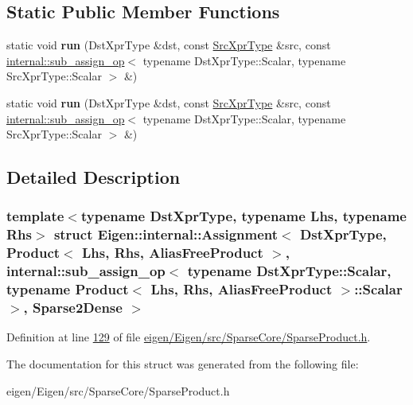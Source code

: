 \subsection*{Static Public Member Functions}
\begin{DoxyCompactItemize}
\item 
\mbox{\label{struct_eigen_1_1internal_1_1_assignment_3_01_dst_xpr_type_00_01_product_3_01_lhs_00_01_rhs_00_014697dd90e96dca324eed00088adc1a1c_ad3dfa9d4dc1b79e20c0ef37b2d3f66fd}} 
static void {\bfseries run} (Dst\+Xpr\+Type \&dst, const \hyperlink{group___core___module_class_eigen_1_1_product}{Src\+Xpr\+Type} \&src, const \hyperlink{struct_eigen_1_1internal_1_1sub__assign__op}{internal\+::sub\+\_\+assign\+\_\+op}$<$ typename Dst\+Xpr\+Type\+::\+Scalar, typename Src\+Xpr\+Type\+::\+Scalar $>$ \&)
\item 
\mbox{\label{struct_eigen_1_1internal_1_1_assignment_3_01_dst_xpr_type_00_01_product_3_01_lhs_00_01_rhs_00_014697dd90e96dca324eed00088adc1a1c_ad3dfa9d4dc1b79e20c0ef37b2d3f66fd}} 
static void {\bfseries run} (Dst\+Xpr\+Type \&dst, const \hyperlink{group___core___module_class_eigen_1_1_product}{Src\+Xpr\+Type} \&src, const \hyperlink{struct_eigen_1_1internal_1_1sub__assign__op}{internal\+::sub\+\_\+assign\+\_\+op}$<$ typename Dst\+Xpr\+Type\+::\+Scalar, typename Src\+Xpr\+Type\+::\+Scalar $>$ \&)
\end{DoxyCompactItemize}


\subsection{Detailed Description}
\subsubsection*{template$<$typename Dst\+Xpr\+Type, typename Lhs, typename Rhs$>$\newline
struct Eigen\+::internal\+::\+Assignment$<$ Dst\+Xpr\+Type, Product$<$ Lhs, Rhs, Alias\+Free\+Product $>$, internal\+::sub\+\_\+assign\+\_\+op$<$ typename Dst\+Xpr\+Type\+::\+Scalar, typename Product$<$ Lhs, Rhs, Alias\+Free\+Product $>$\+::\+Scalar $>$, Sparse2\+Dense $>$}



Definition at line \hyperlink{eigen_2_eigen_2src_2_sparse_core_2_sparse_product_8h_source_l00129}{129} of file \hyperlink{eigen_2_eigen_2src_2_sparse_core_2_sparse_product_8h_source}{eigen/\+Eigen/src/\+Sparse\+Core/\+Sparse\+Product.\+h}.



The documentation for this struct was generated from the following file\+:\begin{DoxyCompactItemize}
\item 
eigen/\+Eigen/src/\+Sparse\+Core/\+Sparse\+Product.\+h\end{DoxyCompactItemize}
